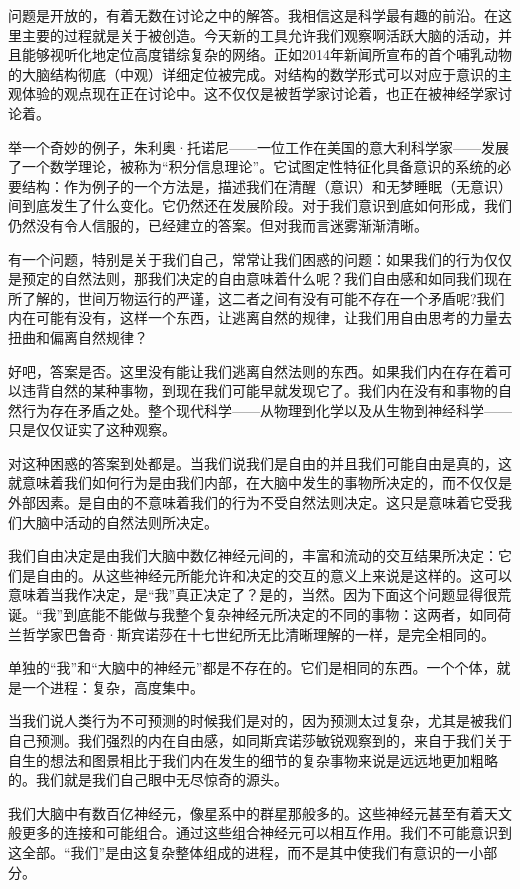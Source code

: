    问题是开放的，有着无数在讨论之中的解答。我相信这是科学最有趣的前沿。在这里主要的过程就是关于被创造。今天新的工具允许我们观察啊活跃大脑的活动，并且能够视听化地定位高度错综复杂的网络。正如2014年新闻所宣布的首个哺乳动物的大脑结构彻底（中观）详细定位被完成。对结构的数学形式可以对应于意识的主观体验的观点现在正在讨论中。这不仅仅是被哲学家讨论着，也正在被神经学家讨论着。

   举一个奇妙的例子，朱利奥·托诺尼——一位工作在美国的意大利科学家——发展了一个数学理论，被称为“积分信息理论”。它试图定性特征化具备意识的系统的必要结构：作为例子的一个方法是，描述我们在清醒（意识）和无梦睡眠（无意识）间到底发生了什么变化。它仍然还在发展阶段。对于我们意识到底如何形成，我们仍然没有令人信服的，已经建立的答案。但对我而言迷雾渐渐清晰。

   有一个问题，特别是关于我们自己，常常让我们困惑的问题：如果我们的行为仅仅是预定的自然法则，那我们决定的自由意味着什么呢？我们自由感和如同我们现在所了解的，世间万物运行的严谨，这二者之间有没有可能不存在一个矛盾呢?我们内在可能有没有，这样一个东西，让逃离自然的规律，让我们用自由思考的力量去扭曲和偏离自然规律？

   好吧，答案是否。这里没有能让我们逃离自然法则的东西。如果我们内在存在着可以违背自然的某种事物，到现在我们可能早就发现它了。我们内在没有和事物的自然行为存在矛盾之处。整个现代科学——从物理到化学以及从生物到神经科学——只是仅仅证实了这种观察。

   对这种困惑的答案到处都是。当我们说我们是自由的并且我们可能自由是真的，这就意味着我们如何行为是由我们内部，在大脑中发生的事物所决定的，而不仅仅是外部因素。是自由的不意味着我们的行为不受自然法则决定。这只是意味着它受我们大脑中活动的自然法则所决定。

   我们自由决定是由我们大脑中数亿神经元间的，丰富和流动的交互结果所决定：它们是自由的。从这些神经元所能允许和决定的交互的意义上来说是这样的。这可以意味着当我作决定，是“我”真正决定了？是的，当然。因为下面这个问题显得很荒诞。“我”到底能不能做与我整个复杂神经元所决定的不同的事物：这两者，如同荷兰哲学家巴鲁奇·斯宾诺莎在十七世纪所无比清晰理解的一样，是完全相同的。

   单独的“我”和“大脑中的神经元”都是不存在的。它们是相同的东西。一个个体，就是一个进程：复杂，高度集中。

   当我们说人类行为不可预测的时候我们是对的，因为预测太过复杂，尤其是被我们自己预测。我们强烈的内在自由感，如同斯宾诺莎敏锐观察到的，来自于我们关于自生的想法和图景相比于我们内在发生的细节的复杂事物来说是远远地更加粗略的。我们就是我们自己眼中无尽惊奇的源头。

   我们大脑中有数百亿神经元，像星系中的群星那般多的。这些神经元甚至有着天文般更多的连接和可能组合。通过这些组合神经元可以相互作用。我们不可能意识到这全部。“我们”是由这复杂整体组成的进程，而不是其中使我们有意识的一小部分。

